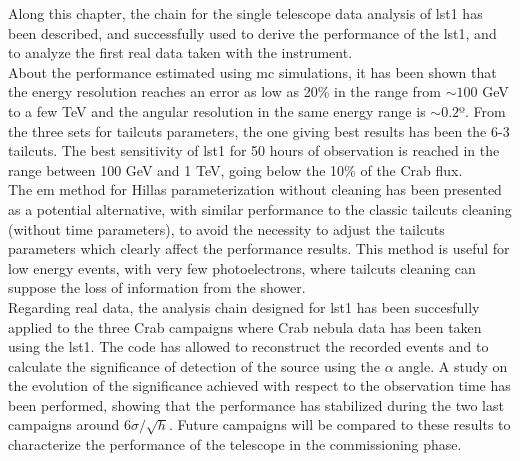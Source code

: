 \documentclass[main.tex]{subfiles}
\begin{document}
Along this chapter, the chain for the single telescope data analysis of \gls{lst}1 has been described, and successfully used to derive the performance of the \gls{lst}1, and to analyze the first real data taken with the instrument.\\
About the performance estimated using \gls{mc} simulations, it has been shown that the energy resolution reaches an error as low as 20\% in the range from $\sim 100$ GeV to a few TeV and the angular resolution in the same energy range is $\sim 0.2$º. From the three sets for tailcuts parameters, the one giving best results has been the 6-3 tailcuts. The best sensitivity of \gls{lst}1 for 50 hours of observation is reached in the range between 100 GeV and 1 TeV, going below the 10\% of the Crab flux.\\
The \gls{em} method for Hillas parameterization without cleaning has been presented as a potential alternative, with similar performance to the classic tailcuts cleaning (without time parameters), to avoid the necessity to adjust the tailcuts parameters which clearly affect the performance results. This method is useful for low energy events, with very few photoelectrons, where tailcuts cleaning can suppose the loss of information from the shower.\\
Regarding real data, the analysis chain designed for \gls{lst}1 has been succesfully applied to the three Crab campaigns where Crab nebula data has been taken using the \gls{lst}1. The code has allowed to reconstruct the recorded events and to calculate the significance of detection of the source using the $\alpha$ angle. A study on the evolution of the significance achieved with respect to the observation time has been performed, showing that the performance has stabilized during the two last campaigns around $6\sigma/\sqrt{h}$. Future campaigns will be compared to these results to characterize the performance of the telescope in the commissioning phase.
\end{document}
